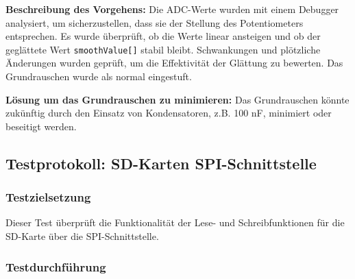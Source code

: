 \textbf{Beschreibung des Vorgehens:}
Die ADC-Werte wurden mit einem Debugger analysiert, um sicherzustellen, dass sie der Stellung des Potentiometers entsprechen. Es wurde überprüft, ob die Werte linear ansteigen und ob der geglättete Wert \texttt{smoothValue[]} stabil bleibt. Schwankungen und plötzliche Änderungen wurden geprüft, um die Effektivität der Glättung zu bewerten. Das Grundrauschen wurde als normal eingestuft.

\textbf{Lösung um das Grundrauschen zu minimieren:}
Das Grundrauschen könnte zukünftig durch den Einsatz von Kondensatoren, z.B. 100 nF, minimiert oder beseitigt werden.


\subsection{Testprotokoll: SD-Karten SPI-Schnittstelle}

\subsubsection{Testzielsetzung}
Dieser Test überprüft die Funktionalität der Lese- und Schreibfunktionen für die SD-Karte über die SPI-Schnittstelle.

\subsubsection{Testdurchführung}

